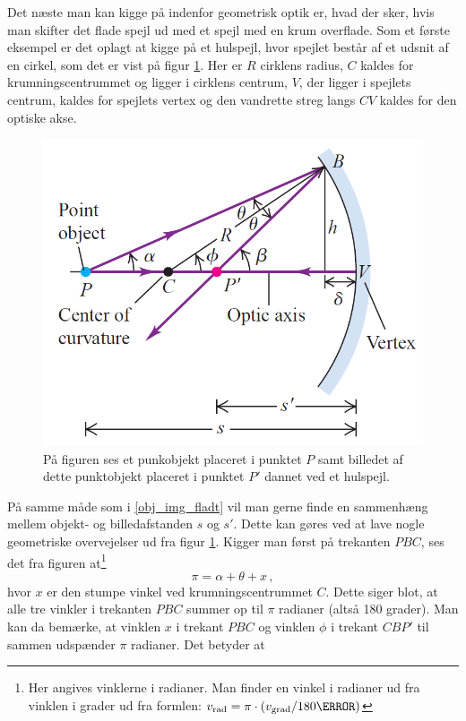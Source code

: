 Det næste man kan kigge på indenfor geometrisk optik er, hvad der sker, hvis man skifter det flade spejl ud med et spejl med en krum overflade. Som et første eksempel er det oplagt at kigge på et hulspejl, hvor spejlet består af et udsnit af en cirkel, som det er vist på figur \ref{billeddannelse_krum}. Her er $R$ cirklens radius, $C$ kaldes for krumningscentrummet og ligger i cirklens centrum, $V$, der ligger i spejlets centrum, kaldes for spejlets vertex og den vandrette streg langs $CV$ kaldes for den optiske akse. 
%
\begin{figure}[h!]
	\centering
	\includegraphics[scale=0.3]{Geometrisk-Optik/billeddannelse_krum.PNG}
	\caption{På figuren ses et punkobjekt placeret i punktet $P$ samt billedet af dette punktobjekt placeret i punktet $P'$ dannet ved et hulspejl.}
	\label{billeddannelse_krum}
\end{figure}
%
På samme måde som i \eqref{obj_img_fladt} vil man gerne finde en sammenhæng mellem objekt- og billedafstanden $s$ og $s'$. Dette kan gøres ved at lave nogle geometriske overvejelser ud fra figur \ref{billeddannelse_krum}. Kigger man først på trekanten $PBC$, ses det fra figuren at\footnote{Her angives vinklerne i radianer. Man finder en vinkel i radianer ud fra vinklen i grader ud fra formlen: $v_{\text{rad}} =  \pi \cdot \left( v_{\text{grad}} /180 \degree \right)$}
$$\pi = \alpha + \theta + x \, ,$$
hvor $x$ er den stumpe vinkel ved krumningscentrummet $C$. Dette siger blot, at alle tre vinkler i trekanten $PBC$ summer op til $\pi$ radianer (altså 180 grader). Man kan da bemærke, at vinklen $x$ i trekant $PBC$ og vinklen $\phi$ i trekant $CBP'$ til sammen udspænder $\pi$ radianer. Det betyder at
